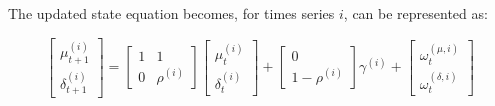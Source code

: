     The updated state equation becomes, for times series $i$, can be represented as:

    \begin{equation}
        \left[
            \begin{array}{c}
                \mu_{t+1}^{(i)} \\
                \delta_{t+1}^{(i)}
            \end{array}
        \right] =
        \left[
            \begin{array}{cc}
                1 & 1 \\
                0 & \rho^{(i)}
            \end{array}
        \right]
        \left[
            \begin{array}{c}
                \mu_{t}^{(i)} \\
                \delta_{t}^{(i)}
            \end{array}
        \right] +
        \left[
            \begin{array}{c}
                0 \\
                1 - \rho^{(i)}
            \end{array}
        \right]
        \gamma^{(i)} +
        \left[
            \begin{array}{c}
                \omega_{t}^{(\mu,i)} \\
                \omega_{t}^{(\delta,i)}
            \end{array}
        \right]
        \label{eq:state_update_state}
    \end{equation}


